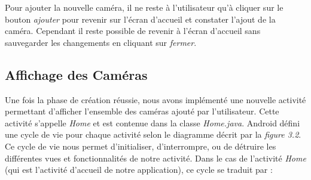 \indent Pour ajouter la nouvelle
caméra, il ne reste à l'utilisateur qu'à cliquer sur le bouton
\textit{ajouter} pour revenir sur l'écran d'accueil et constater l'ajout de la caméra. Cependant il reste possible de revenir à l'écran d'accueil sans sauvegarder les changements en cliquant sur \textit{fermer}.

\subsection{Affichage des Caméras}
Une fois la phase de création réussie, nous avons implémenté une nouvelle
activité permettant d'afficher l'ensemble des caméras ajouté par l'utilisateur.
Cette activité s'appelle \textit{Home} et est contenue dans la classe
\textit{Home.java}.\newline \newline
\indent Android défini une cycle de vie pour chaque activité selon le diagramme
décrit par la \textit{figure 3.2}.
\newline
\indent Ce cycle de vie nous permet d'initialiser, d'interrompre, ou de détruire
les différentes vues et fonctionnalités de notre activité. Dans le cas de
l'activité \textit{Home} (qui est l'activité d'accueil de notre application), ce cycle se traduit par : 
